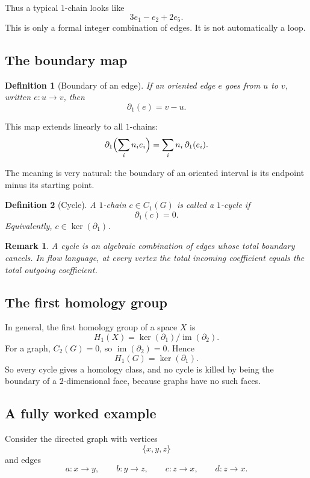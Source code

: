 \documentclass[12pt,a4paper]{article}
\newtheorem{definition}{Definition}[section]
\theoremstyle{notespace}
\newtheorem{remark}{Remark}[section]
\begin{document}
	Thus a typical \(1\)-chain looks like
	\[
	3e_1-e_2+2e_5.
	\]
	This is only a formal integer combination of edges. It is not automatically a loop.
	
	\subsection{The boundary map}
	
	\begin{definition}[Boundary of an edge]
		If an oriented edge \(e\) goes from \(u\) to \(v\), written \(e:u\to v\), then
		\[
		\partial_1(e)=v-u.
		\]
	\end{definition}
	
	This map extends linearly to all \(1\)-chains:
	\[
	\partial_1\Bigl(\sum_i n_i e_i\Bigr)=\sum_i n_i\,\partial_1(e_i).
	\]
	
	The meaning is very natural: the boundary of an oriented interval is its endpoint minus its starting point.
	
	\begin{definition}[Cycle]
		A \(1\)-chain \(c\in C_1(G)\) is called a \emph{\(1\)-cycle} if
		\[
		\partial_1(c)=0.
		\]
		Equivalently, \(c\in \ker(\partial_1)\).
	\end{definition}
	
	\begin{remark}
		A cycle is an algebraic combination of edges whose total boundary cancels. In flow language, at every vertex the total incoming coefficient equals the total outgoing coefficient.
	\end{remark}
	
	\subsection{The first homology group}
	
	In general, the first homology group of a space \(X\) is
	\[
	H_1(X)=\ker(\partial_1)\big/\operatorname{im}(\partial_2).
	\]
	For a graph, \(C_2(G)=0\), so \(\operatorname{im}(\partial_2)=0\). Hence
	\[
	H_1(G)=\ker(\partial_1).
	\]
	So every cycle gives a homology class, and no cycle is killed by being the boundary of a \(2\)-dimensional face, because graphs have no such faces.
	
	\subsection{A fully worked example}
	
	Consider the directed graph with vertices
	\[
	\{x,y,z\}
	\]
	and edges
	\[
	a:x\to y,\qquad b:y\to z,\qquad c:z\to x,\qquad d:z\to x.
	\]
	
\end{document}
